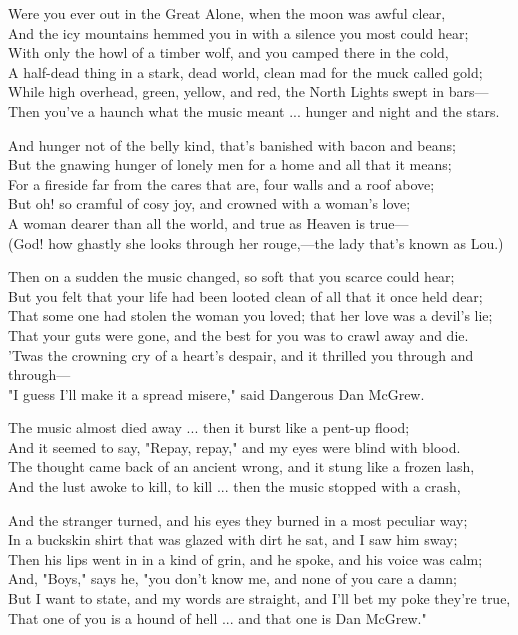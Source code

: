 \begin{poemblock}
Were you ever out in the Great Alone, when the moon was awful clear,\\
And the icy mountains hemmed you in with a silence you most could hear;\\
With only the howl of a timber wolf, and you camped there in the cold,\\
A half-dead thing in a stark, dead world, clean mad for the muck called gold;\\
While high overhead, green, yellow, and red, the North Lights swept in bars—\\
Then you've a haunch what the music meant ... hunger and night and the stars.

And hunger not of the belly kind, that's banished with bacon and beans;\\
But the gnawing hunger of lonely men for a home and all that it means;\\
For a fireside far from the cares that are, four walls and a roof above;\\
But oh! so cramful of cosy joy, and crowned with a woman's love;\\
A woman dearer than all the world, and true as Heaven is true—\\
(God! how ghastly she looks through her rouge,—the lady that's known as Lou.)

Then on a sudden the music changed, so soft that you scarce could hear;\\
But you felt that your life had been looted clean of all that it once held dear;\\
That some one had stolen the woman you loved; that her love was a devil's lie;\\
That your guts were gone, and the best for you was to crawl away and die.\\
'Twas the crowning cry of a heart's despair, and it thrilled you through and through—\\
"I guess I'll make it a spread misere," said Dangerous Dan McGrew.

The music almost died away ... then it burst like a pent-up flood;\\
And it seemed to say, "Repay, repay," and my eyes were blind with blood.\\
The thought came back of an ancient wrong, and it stung like a frozen lash,\\
And the lust awoke to kill, to kill ... then the music stopped with a crash,

And the stranger turned, and his eyes they burned in a most peculiar way;\\
In a buckskin shirt that was glazed with dirt he sat, and I saw him sway;\\
Then his lips went in in a kind of grin, and he spoke, and his voice was calm;\\
And, "Boys," says he, "you don't know me, and none of you care a damn;\\
But I want to state, and my words are straight, and I'll bet my poke they're true,\\
That one of you is a hound of hell ... and that one is Dan McGrew."


\end{poemblock}
